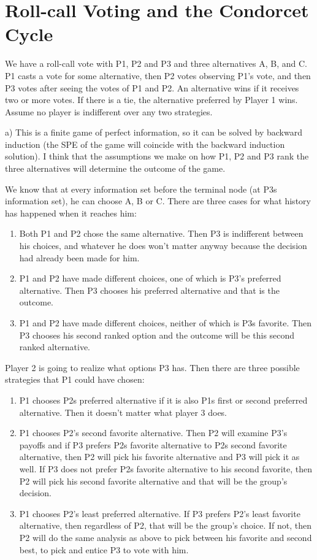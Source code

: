 \documentclass[letter,11pt]{article}
\begin{document}
\section{Roll-call Voting and the Condorcet Cycle}
\hfill

We have a roll-call vote with P1, P2 and P3 and three alternatives A, B, and C. P1 casts a vote for some alternative, then P2 votes observing P1's vote, and then P3 votes after seeing the votes of P1 and P2. An alternative wins if it receives two or more votes. If there is a tie, the alternative preferred by Player 1 wins. Assume no player is indifferent over any two strategies.

a) This  is a finite game of perfect information, so it can be solved by backward induction (the SPE of the game will coincide with the backward induction solution). I think that the assumptions we make on how P1, P2 and P3 rank the three alternatives will determine the outcome of the game.

We know that at every information set before the terminal node (at P3s information set), he can choose A, B or C. There are three cases for what history has happened when it reaches him:
\begin{enumerate}
\item Both P1 and P2 chose the same alternative. Then P3 is indifferent between his choices, and whatever he does won't matter anyway because the decision had already been made for him.
\item P1 and P2 have made different choices, one of which is P3's preferred alternative. Then P3 chooses his preferred alternative and that is the outcome.
\item P1 and P2 have made different choices, neither of which is P3s favorite. Then P3 chooses his second ranked option and the outcome will be this second ranked alternative.
\end{enumerate}

Player 2 is going to realize what options P3 has. Then there are three possible strategies that P1 could have chosen:
\begin{enumerate}
\item P1 chooses P2s preferred alternative if it is also P1s first or second preferred alternative. Then it doesn't matter what player 3 does.
\item P1 chooses P2's second favorite alternative. Then P2 will examine P3's payoffs and if P3 prefers P2s favorite alternative to P2s second favorite alternative, then P2 will pick his favorite alternative and P3 will pick it as well. If P3 does not prefer P2s favorite alternative to his second favorite, then P2 will pick his second favorite alternative and that will be the group's decision.
\item P1 chooses P2's least preferred alternative. If P3 prefers P2's least favorite alternative, then regardless of P2, that will be the group's choice. If not, then P2 will do the same analysis as above to pick between his favorite and second best, to pick and entice P3 to vote with him.
\end{enumerate}
\end{document}
